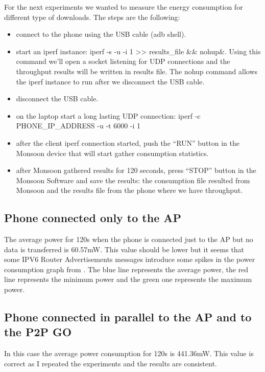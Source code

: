 For the next experiments we wanted to measure the energy consumption for different type of downloads. The steps are the following:
\begin{itemize}
  \item connect to the phone using the USB cable (adb shell).
  \item start an iperf instance: iperf -s -u -i 1 >> results_file \&\& nohup\&. Using this command we'll open a socket listening for UDP connections and the throughput results will be written in results file. The nohup command allows the iperf instance to run after we disconnect the USB cable.
  \item disconnect the USB cable.
  \item on the laptop start a long lasting UDP connection: iperf -c PHONE_IP_ADDRESS -u -t 6000 -i 1
  \item after the client iperf connection started, push the “RUN” button in the Monsoon device that will start gather consumption statistics.
  \item after Monsoon gathered results for 120 seconds, press “STOP” button in the Monsoon Software and save the results: the consumption file resulted from Monsoon and the results file from the phone where we have throughput.
\end{itemize}

\subsection{Phone connected only to the AP}
\label{sub-sec:ap-only}
The average power for 120s when the phone is connected just to the AP but no data is transferred is 60.57mW. This value should be lower but it seems that some IPV6 Router Advertisements messages introduce some spikes in the power consumption graph from . The blue line represents the average power, the red line represents the
minimum power and the green one represents the maximum power.


\subsection{Phone connected in parallel to the AP and to the P2P GO}
\label{sub-sec:app2p-parallel}
In this case the average power consumption for 120s is 441.36mW. This value is correct as I repeated the experiments and the results are consistent.

